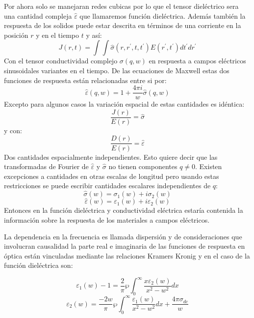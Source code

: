 \documentclass[a4paper,openright,12pt]{book}
\begin{document}
Por ahora solo se manejaran redes cubicas por lo que el tensor dieléctrico sera una cantidad compleja $\hat{\varepsilon}$ que llamaremos función dieléctrica. Además también la respuesta de los solidos puede estar descrita en términos de una corriente en la posición $r$ y en el tiempo $t$ y así:
\begin{equation}
J(r,t)=\int\int\hat{\sigma}(r,r^{'},t,t^{'})E(r^{'},t^{'})dt^{'}dr^{'}
\end{equation}
Con el tensor conductividad complejo $\sigma(q,w)$ en respuesta a campos eléctricos sinusoidales  variantes en el tiempo. De las ecuaciones de Maxwell estas dos funciones de respuesta están relacionadas entre si por:
\begin{equation}
\hat{\varepsilon}(q,w)=1+\dfrac{4\pi i}{w}\hat{\sigma }(q,w)
\end{equation}
Excepto para algunos casos la variación espacial de estas cantidades es idéntica:
\begin{equation}
\dfrac{J(r)}{E(r)}=\hat{\sigma }
\end{equation}
y con:
\begin{equation}
\dfrac{D(r)}{E(r)}=\hat{\varepsilon}
\end{equation}
Dos cantidades espacialmente independientes. Esto quiere decir que las transformadas de Fourier de $\hat{\varepsilon}$ y $\hat{\sigma}$ no tienen componentes $q\neq 0$. Existen  excepciones a cantidades en otras escalas de longitud pero usando estas restricciones se puede escribir cantidades escalares independientes de $q$:
\begin{equation}\label{varepsi}
\hat{\sigma}(w)=\sigma_{1}(w)+i\sigma_{2}(w)
\end{equation}
\begin{equation}
\hat{\varepsilon}(w)=\varepsilon_{1}(w)+i\varepsilon_{2}(w)
\end{equation}
Entonces en la función dieléctrica y conductividad eléctrica estaría contenida la información sobre la respuesta de los materiales a campos eléctricos.

La dependencia en la frecuencia es llamada dispersión y de consideraciones que involucran causalidad la parte real e imaginaria de las funciones de respuesta en óptica están vinculadas mediante las relaciones Kramers Kronig y en el caso de la función dieléctrica son:

\begin{equation}\label{varepsi1}
\varepsilon_{1}(w)-1=\frac{2}{\pi}\wp \int_{0}^{\infty}\frac{x\varepsilon_{2}(w)}{x^{2}-w^{2}}dx
\end{equation}
\begin{equation}\label{varepsi2}
\varepsilon_{2}(w)=\frac{-2w}{\pi}\wp\int_{0}^{\infty}\frac{\varepsilon_{1}(w)}{x^{2}-w^{2}}dx+\frac{4\pi\sigma_{dc}}{w}
\end{equation}
\end{document}
